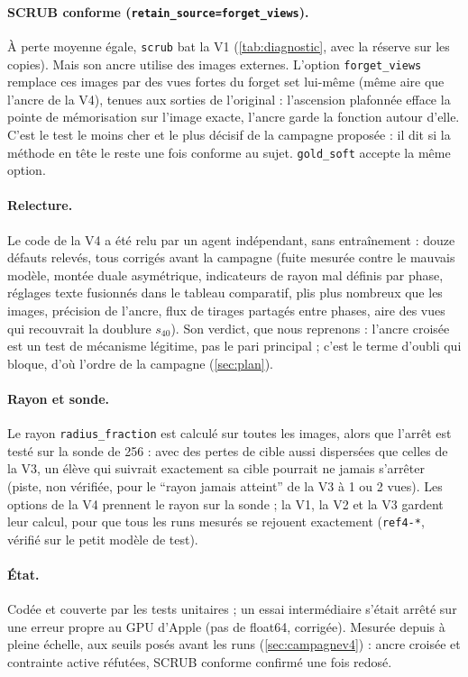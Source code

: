 \documentclass[11pt,a4paper]{article}
\newcommand{\code}[1]{\texttt{#1}}
\begin{document}
\paragraph{SCRUB conforme (\code{retain\_source=forget\_views}).} À perte moyenne égale, \code{scrub}
bat la V1 (\cref{tab:diagnostic}, avec la réserve sur les copies). Mais son ancre utilise des images
externes. L'option \code{forget\_views} remplace ces images par des vues fortes du forget set
lui-même (même aire que l'ancre de la V4), tenues aux sorties de l'original : l'ascension plafonnée
efface la pointe de mémorisation sur l'image exacte, l'ancre garde la fonction autour d'elle.
C'est le test le moins cher et le plus décisif de la campagne proposée : il dit si la méthode en
tête le reste une fois conforme au sujet. \code{gold\_soft} accepte la même option.

\paragraph{Relecture.} Le code de la V4 a été relu par un agent indépendant, sans entraînement :
douze défauts relevés, tous corrigés avant la campagne (fuite mesurée contre le mauvais modèle,
montée duale asymétrique, indicateurs de rayon mal définis par phase, réglages texte fusionnés dans
le tableau comparatif, plis plus nombreux que les images, précision de l'ancre, flux de tirages
partagés entre phases, aire des vues qui recouvrait la doublure $s_{40}$). Son verdict, que nous
reprenons : l'ancre croisée est un test de mécanisme légitime, pas le pari principal ; c'est le
terme d'oubli qui bloque, d'où l'ordre de la campagne (\cref{sec:plan}).

\paragraph{Rayon et sonde.} Le rayon \code{radius\_fraction} est calculé sur toutes les images,
alors que l'arrêt est testé sur la sonde de 256 : avec des pertes de cible aussi dispersées que
celles de la V3, un élève qui suivrait exactement sa cible pourrait ne jamais s'arrêter (piste,
non vérifiée, pour le \enquote{rayon jamais atteint} de la V3 à 1 ou 2 vues). Les options de la V4
prennent le rayon sur la sonde ; la V1, la V2 et la V3 gardent leur calcul, pour que tous les runs
mesurés se rejouent exactement (\code{ref4-*}, vérifié sur le petit modèle de test).

\paragraph{État.} Codée et couverte par les tests unitaires ; un essai intermédiaire s'était arrêté
sur une erreur propre au GPU d'Apple (pas de float64, corrigée). Mesurée depuis à pleine échelle,
aux seuils posés avant les runs (\cref{sec:campagnev4}) : ancre croisée et contrainte active
réfutées, SCRUB conforme confirmé une fois redosé.
\end{document}
